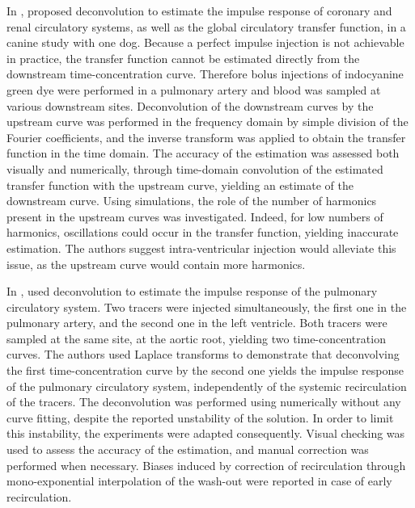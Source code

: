 In \citeyear{Coulam:1966un}, \citet{Coulam:1966un} proposed deconvolution to estimate the impulse response of coronary and renal circulatory systems, as well as the global circulatory transfer function, in a canine study with one dog.
Because a perfect impulse injection is not achievable in practice, the transfer function cannot be estimated directly from the downstream time-concentration curve.
Therefore bolus injections of indocyanine green dye were performed in a pulmonary artery and blood was sampled at various downstream sites.
Deconvolution of the downstream curves by the upstream curve was performed in the frequency domain by simple division of the Fourier coefficients, and the inverse transform was applied to obtain the transfer function in the time domain.
The accuracy of the estimation was assessed both visually and numerically, through time-domain convolution of the estimated transfer function with the upstream curve, yielding an estimate of the downstream curve. 
Using simulations, the role of the number of harmonics present in the upstream curves was investigated.
Indeed, for low numbers of harmonics, oscillations could occur in the transfer function, yielding inaccurate estimation.
The authors suggest intra-ventricular injection would alleviate this issue, as the upstream curve would contain more harmonics.

In \citeyear{Maseri:1970gn}, \citet{Maseri:1970gn} used deconvolution to estimate the impulse response of the pulmonary circulatory system.
Two tracers were injected simultaneously, the first one in the pulmonary artery, and the second one in the left ventricle.
Both tracers were sampled at the same site, at the aortic root, yielding two time-concentration curves. 
The authors used Laplace transforms to demonstrate that deconvolving the first time-concentration curve by the second one yields the impulse response of the pulmonary circulatory system, independently of the systemic recirculation of the tracers. 
The deconvolution was performed using numerically without any curve fitting, despite the reported unstability of the solution.
In order to limit this instability, the experiments were adapted consequently. 
Visual checking was used to assess the accuracy of the estimation, and manual correction was performed when necessary.
Biases induced by correction of recirculation through mono-exponential interpolation of the wash-out were reported in case of early recirculation.

